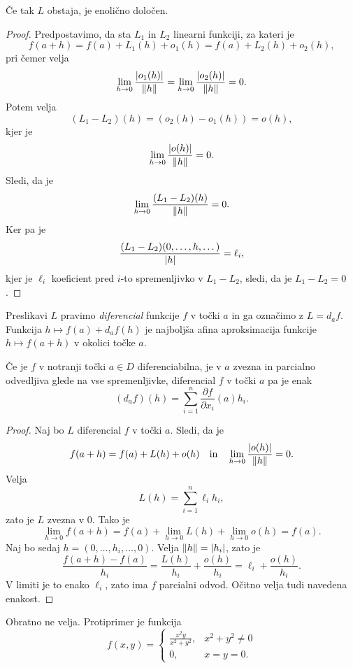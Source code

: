 \begin{trditev}
Če tak $L$ obstaja, je enolično določen.
\end{trditev}

\begin{proof}
Predpostavimo, da sta $L_1$ in $L_2$ linearni funkciji, za kateri
je
\[
f(a+h) = f(a) + L_1(h) + o_1(h) = f(a) + L_2(h) + o_2(h),
\]
pri čemer velja
\[
\lim_{h \to 0}\frac{\left\lvert o_1(h)\right\rvert}{\left\lVert h\right\rVert} =
\lim_{h \to 0}\frac{\left\lvert o_2(h)\right\rvert}{\left\lVert h\right\rVert} = 0.
\]
Potem velja
\[
(L_1 - L_2)(h) = (o_2(h) - o_1(h)) = o(h),
\]
kjer je
\[
\lim_{h \to 0}\frac{\left\lvert o(h)\right\rvert}{\left\lVert h\right\rVert} = 0.
\]
Sledi, da je
\[
\lim_{h \to 0}\frac{(L_1 - L_2)(h)}{\left\lVert h\right\rVert} = 0.
\]
Ker pa je
\[
\frac{(L_1 - L_2)(0, \dots, h, \dots)}{\left\lvert h\right\rvert} = \ell_i,
\]
kjer je $\ell_i$ koeficient pred $i$-to spremenljivko v
$L_1 - L_2$, sledi, da je $L_1 - L_2 = 0$.
\end{proof}


\begin{opomba}
Preslikavi $L$ pravimo \emph{diferencial} funkcije $f$ v točki $a$
in ga označimo z $L = d_af$. Funkcija $h \mapsto f(a) + d_af(h)$ je
najboljša afina aproksimacija funkcije $h \mapsto f(a+h)$ v okolici
točke $a$.
\end{opomba}

\begin{izrek}
Če je $f$ v notranji točki $a \in D$ diferenciabilna, je v $a$
zvezna in parcialno odvedljiva glede na vse spremenljivke,
diferencial $f$ v točki $a$ pa je enak
\[
(d_af)(h) = \sum_{i=1}^n \frac{\partial f}{\partial x_i}(a) h_i.
\]
\end{izrek}

\begin{proof}
Naj bo $L$ diferencial $f$ v točki $a$. Sledi, da je
\[
f(a+h) = f(a) + L(h) + o(h)
\quad \text{in} \quad
\lim_{h \to 0}\frac{\left\lvert o(h)\right\rvert}{\left\lVert h\right\rVert} = 0.
\]
Velja
\[
L(h) = \sum_{i=1}^n \ell_i h_i,
\]
zato je $L$ zvezna v $0$. Tako je
\[
\lim_{h \to 0}f(a+h) =
f(a) + \lim_{h \to 0} L(h) + \lim_{h \to 0}o(h) =
f(a).
\]
Naj bo sedaj $h = (0,\dots, h_i, \dots,0)$. Velja
$\left\lVert h\right\rVert = \left\lvert h_i\right\rvert$, zato je
\[
\frac{f(a+h) - f(a)}{h_i} =
\frac{L(h)}{h_i} + \frac{o(h)}{h_i} =
\ell_i + \frac{o(h)}{h_i}.
\]
V limiti je to enako $\ell_i$, zato ima $f$ parcialni odvod. Očitno
velja tudi navedena enakost.
\end{proof}

\begin{opomba}
Obratno ne velja. Protiprimer je funkcija
\[
f(x,y)=\begin{cases}
\frac{x^2y}{x^2+y^2},& x^2+y^2\ne 0 \\
0,& x=y=0.
\end{cases}
\]
\end{opomba}

